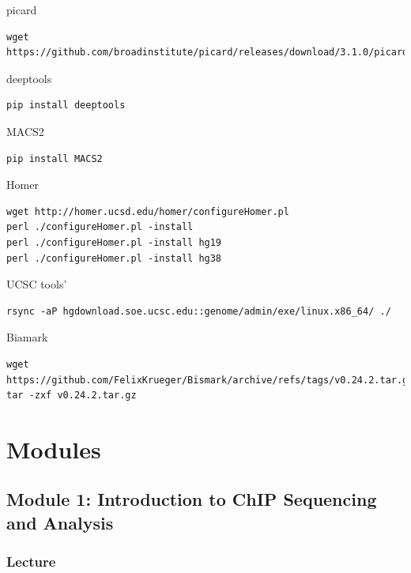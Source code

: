 \documentclass[
]{book}
\begin{document}
\subparagraph{picard}\label{picard}

\begin{verbatim}
wget https://github.com/broadinstitute/picard/releases/download/3.1.0/picard.jar
\end{verbatim}

\subparagraph{deeptools}\label{deeptools}

\begin{verbatim}
pip install deeptools
\end{verbatim}

\subparagraph{MACS2}\label{macs2}

\begin{verbatim}
pip install MACS2
\end{verbatim}

\subparagraph{Homer}\label{homer}

\begin{verbatim}
wget http://homer.ucsd.edu/homer/configureHomer.pl
perl ./configureHomer.pl -install
perl ./configureHomer.pl -install hg19
perl ./configureHomer.pl -install hg38
\end{verbatim}

\subparagraph{UCSC tools'}\label{ucsc-tools}

\begin{verbatim}
rsync -aP hgdownload.soe.ucsc.edu::genome/admin/exe/linux.x86_64/ ./
\end{verbatim}

\subparagraph{Biamark}\label{biamark}

\begin{verbatim}
wget https://github.com/FelixKrueger/Bismark/archive/refs/tags/v0.24.2.tar.gz
tar -zxf v0.24.2.tar.gz
\end{verbatim}

\part{Modules}\label{part-modules}

\chapter{Module 1: Introduction to ChIP Sequencing and Analysis}\label{module-1-introduction-to-chip-sequencing-and-analysis}

\section{Lecture}\label{lecture}
\end{document}

